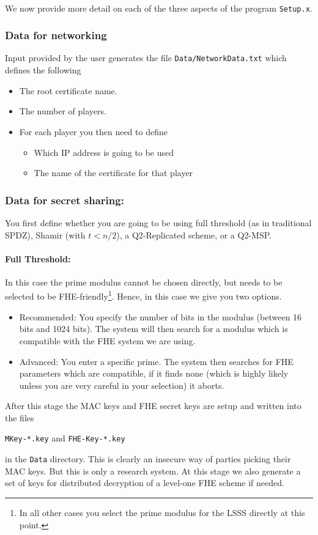 ~~

\noindent We now provide more detail on each of the three aspects of the program
\verb+Setup.x+.

\subsubsection{Data for networking}
Input provided by the user generates the file
\verb+Data/NetworkData.txt+ which defines the following
\begin{itemize}
\item The root certificate name.
\item The number of players.
\item For each player you then need to define
\begin{itemize}
  \item Which IP address is going to be used
  \item The name of the certificate for that player
\end{itemize}
\iffalse XXXX
\item Whether a fake offline phase is going to be used.
\item Whether a fake sacrifice phase is going to be used.
\fi
\end{itemize}

\subsubsection{Data for secret sharing:}
You first define whether you are going to be using full threshold (as in
traditional SPDZ), Shamir (with $t<n/2$), a Q2-Replicated scheme, or
a Q2-MSP.

\paragraph{Full Threshold:}
In this case the prime modulus cannot be chosen directly, but
needs to be selected to be FHE-friendly\footnote{In all other cases you select the prime modulus for the LSSS directly at this point.}.
Hence, in this case we give you two options.
\begin{itemize}
\item Recommended: You specify the number of bits in the modulus
(between 16 bits and 1024 bits).  The system will then
search for a modulus which is compatible with the FHE system we are
using.
\item Advanced: You enter a specific prime. The system then searches
for FHE parameters which are compatible, if it finds none (which is highly
likely unless you are very careful in your selection) it aborts.
\end{itemize}
After this stage the MAC keys and FHE secret keys are setup and written into the
files
\begin{center}
\verb+MKey-*.key+ and \verb+FHE-Key-*.key+
\end{center}
in the \verb+Data+ directory.
This is clearly an insecure way of parties picking their MAC keys. But this is only a
research system.
At this stage we also generate a set of keys
for distributed decryption of a level-one FHE scheme if needed.

